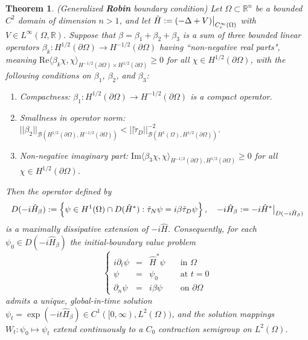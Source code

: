 \documentclass{article}
\numberwithin{equation}{section}
\newtheorem{theoremmainagain}{Theorem}
\begin{document}
\begin{theoremmainagain}\label{Robin boundary conditions ugliest}
    (Generalized \textbf{Robin} boundary condition) Let $\Omega \subset \mathbb{R}^n$ be a bounded $C^2$ domain of dimension $n>1$, and let $\hat{H}:=(-\Delta+V)\big{|}_{C_c^\infty(\Omega)}$ with $V \in L^\infty(\Omega,\mathbb{R})$. Suppose that $\beta=\beta_1+\beta_2+\beta_3$ is a sum of three bounded linear operators $\beta_k:H^{1/2}(\partial \Omega)\to H^{-1/2}(\partial \Omega)$ having ``non-negative real parts", meaning \em $\text{Re}\langle \beta_k \chi,\chi \rangle_{H^{-1/2}(\partial \Omega)\times H^{1/2}(\partial \Omega)}\geq 0$ \em for all $\chi\in H^{1/2}(\partial \Omega)$, with the following conditions on $\beta_1$, $\beta_2$, and $\beta_3$:
    \begin{enumerate}
        \em \item[(R1)]\em Compactness: $\beta_1:H^{1/2}(\partial \Omega)\to H^{-1/2}(\partial \Omega)$ is a compact operator.
        \em \item[(R2)]\em Smallness in operator norm: $||\beta_2
        ||_{\mathcal{B}(H^{1/2}(\partial \Omega),H^{-1/2}(\partial \Omega))}< ||\tilde\tau_D||^{-2}_{\mathcal{B}(H^{1}( \Omega),H^{1/2}(\partial \Omega))}$.
        \em \item[(R3)]\em Non-negative imaginary part: \em $\text{Im}\langle \beta_3 \chi, \chi\rangle_{H^{-1/2}(\partial \Omega),H^{1/2}(\partial \Omega)}\geq 0$ \em for all $\chi \in H^{1/2}(\partial \Omega)$. 
    \end{enumerate}
    Then the operator defined by
    \begin{equation}\label{non compact Robin def}
        D(-i\hat{H}_\beta):=\left\{\psi \in H^1(\Omega)\cap D(\hat{H}^*):\tilde{\tau}_N \psi=i \beta \tilde{\tau}_D \psi \right\}, \quad -i\hat{H}_\beta:=-i\hat{H}^*\big{|}_{D(-i\hat{H}_\beta)}
    \end{equation}
    is a maximally dissipative extension of $-i\hat{H}$. Consequently, for each $\psi_0 \in D(-i\hat{H}_\beta)$ the initial-boundary value problem
    \em \begin{equation}\label{Ugliest Robin IBVP}
\left\{\begin{array}{rclr}
       i \partial_t \psi&=& \hat{H}^* \psi \quad &\text{in } \Omega
       \\
       \psi &=&\psi_0 \quad &\text{at } t=0
       \\
       \partial_n \psi&=&i \beta \psi \quad &\text{on } \partial \Omega
    \end{array}
    \right.
    \end{equation}
    \em admits a unique, global-in-time solution $\psi_t=\exp(-it\hat{H}_\beta)\in C^1([0,\infty),L^2(\Omega))$, and the solution mappings $W_t:\psi_0\mapsto \psi_t$ extend continuously to a $C_0$ contraction semigroup on $L^2(\Omega)$.
\end{theoremmainagain}
\end{document}
